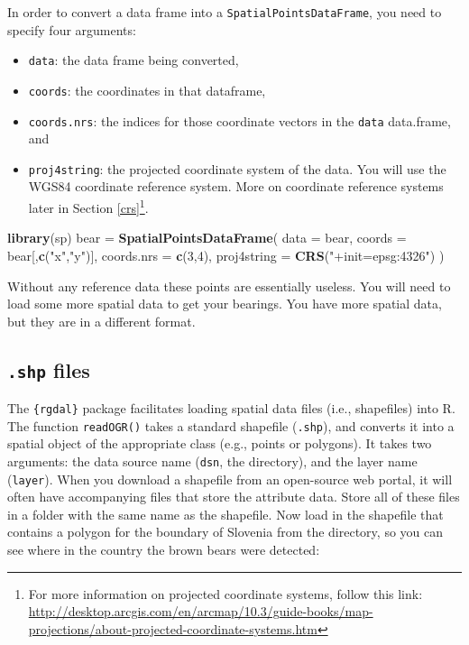 \documentclass[]{book}
\newenvironment{Shaded}{\begin{snugshade}}{\end{snugshade}}
\newcommand{\KeywordTok}[1]{\textcolor[rgb]{0.13,0.29,0.53}{\textbf{#1}}}
\newcommand{\DataTypeTok}[1]{\textcolor[rgb]{0.13,0.29,0.53}{#1}}
\newcommand{\DecValTok}[1]{\textcolor[rgb]{0.00,0.00,0.81}{#1}}
\newcommand{\StringTok}[1]{\textcolor[rgb]{0.31,0.60,0.02}{#1}}
\newcommand{\NormalTok}[1]{#1}
\providecommand{\tightlist}{%
  \setlength{\itemsep}{0pt}\setlength{\parskip}{0pt}}
\let\rmarkdownfootnote\footnote%
\def\footnote{\protect\rmarkdownfootnote}
\theoremstyle{definition}
\theoremstyle{definition}
\theoremstyle{definition}
\theoremstyle{remark}
\begin{document}
In order to convert a data frame into a \texttt{SpatialPointsDataFrame},
you need to specify four arguments:

\begin{itemize}
\tightlist
\item
  \texttt{data}: the data frame being converted,
\item
  \texttt{coords}: the coordinates in that dataframe,
\item
  \texttt{coords.nrs}: the indices for those coordinate vectors in the
  \texttt{data} data.frame, and
\item
  \texttt{proj4string}: the projected coordinate system of the data. You
  will use the WGS84 coordinate reference system. More on coordinate
  reference systems later in Section \ref{crs}\footnote{For more
    information on projected coordinate systems, follow this link:
    \url{http://desktop.arcgis.com/en/arcmap/10.3/guide-books/map-projections/about-projected-coordinate-systems.htm}}.
\end{itemize}

\begin{Shaded}
\begin{Highlighting}[]
\KeywordTok{library}\NormalTok{(sp)}
\NormalTok{bear =}\StringTok{ }\KeywordTok{SpatialPointsDataFrame}\NormalTok{(}
  \DataTypeTok{data =}\NormalTok{ bear,}
  \DataTypeTok{coords =}\NormalTok{ bear[,}\KeywordTok{c}\NormalTok{(}\StringTok{"x"}\NormalTok{,}\StringTok{"y"}\NormalTok{)],}
  \DataTypeTok{coords.nrs =} \KeywordTok{c}\NormalTok{(}\DecValTok{3}\NormalTok{,}\DecValTok{4}\NormalTok{),}
  \DataTypeTok{proj4string =} \KeywordTok{CRS}\NormalTok{(}\StringTok{"+init=epsg:4326"}\NormalTok{)}
\NormalTok{  )}
\end{Highlighting}
\end{Shaded}

Without any reference data these points are essentially useless. You
will need to load some more spatial data to get your bearings. You have
more spatial data, but they are in a different format.

\subsection{\texorpdfstring{\texttt{.shp}
files}{.shp files}}\label{shp-files}

The \texttt{\{rgdal\}} package \citep{R-rgdal} facilitates loading
spatial data files (i.e., shapefiles) into R. The function
\texttt{readOGR()} takes a standard shapefile (\texttt{.shp}), and
converts it into a spatial object of the appropriate class (e.g., points
or polygons). It takes two arguments: the data source name
(\texttt{dsn}, the directory), and the layer name (\texttt{layer}). When
you download a shapefile from an open-source web portal, it will often
have accompanying files that store the attribute data. Store all of
these files in a folder with the same name as the shapefile. Now load in
the shapefile that contains a polygon for the boundary of Slovenia
\citep{svn-cite} from the directory, so you can see where in the country
the brown bears were detected:
\end{document}
